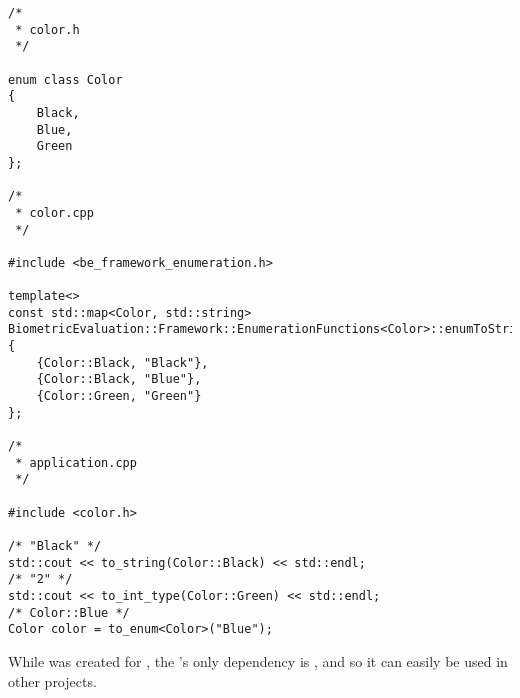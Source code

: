 \begin{lstlisting}[caption={\namespace{Framework::Enumeration}}, label=framework-enumeration]
/*
 * color.h
 */

enum class Color
{
	Black,
	Blue,
	Green
};

/*
 * color.cpp
 */

#include <be_framework_enumeration.h>

template<>
const std::map<Color, std::string>
BiometricEvaluation::Framework::EnumerationFunctions<Color>::enumToStringMap {
	{Color::Black, "Black"},
	{Color::Black, "Blue"},
	{Color::Green, "Green"}
};

/*
 * application.cpp
 */

#include <color.h>

/* "Black" */
std::cout << to_string(Color::Black) << std::endl;
/* "2" */
std::cout << to_int_type(Color::Green) << std::endl;
/* Color::Blue */
Color color = to_enum<Color>("Blue");
\end{lstlisting}

While  was created for \sname, the
's only dependency is , and so it can easily be
used in other \CppXI projects.
